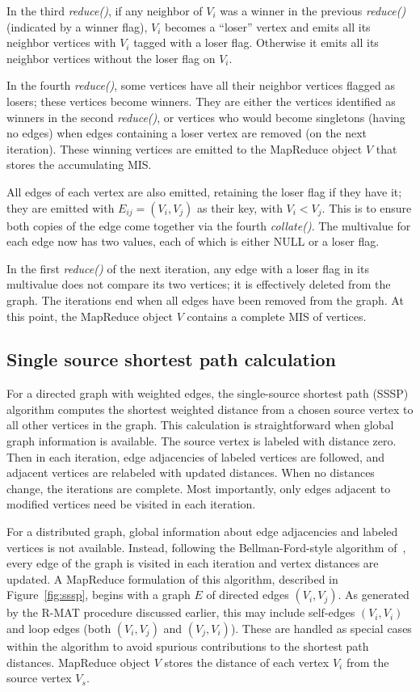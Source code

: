 In the third {\it reduce()}, if any neighbor of $V_i$ was a winner in
the previous {\it reduce()} (indicated by a winner flag), $V_i$
becomes a ``loser'' vertex and emits all its neighbor vertices with
$V_i$ tagged with a loser flag.  Otherwise it emits all its neighbor
vertices without the loser flag on $V_i$.

In the fourth {\it reduce()}, some vertices have all their neighbor
vertices flagged as losers; these vertices become winners.  They are
either the vertices identified as winners in the second {\it
reduce()}, or vertices who would become singletons (having no edges)
when edges containing a loser vertex are removed (on the next
iteration).  These winning vertices are emitted to the MapReduce
object $V$ that stores the accumulating MIS.

All edges of each vertex are also emitted, retaining the loser flag if
they have it; they are emitted with $E_{ij} = (V_i, V_j)$ as their
key, with $V_i < V_j$.  This is to ensure both copies of the edge come
together via the fourth {\it collate()}.  The multivalue for each edge
now has two values, each of which is either NULL or a loser flag.

In the first {\it reduce()} of the next iteration, any edge with a
loser flag in its multivalue does not compare its two vertices; it is
effectively deleted from the graph.  The iterations end when all edges
have been removed from the graph.  At this point, the MapReduce object
$V$ contains a complete MIS of vertices.

\subsection{Single source shortest path calculation}

For a directed graph with weighted edges, the single-source shortest
path (SSSP) algorithm computes the shortest weighted distance from a
chosen source vertex to all other vertices in the graph.  This
calculation is straightforward when global graph information is
available.  The source vertex is labeled with distance zero.  Then in
each iteration, edge adjacencies of labeled vertices are followed, and
adjacent vertices are relabeled with updated distances.  When no
distances change, the iterations are complete.  Most importantly, only
edges adjacent to modified vertices need be visited in each iteration.

For a distributed graph, global information about edge adjacencies and
labeled vertices is not available.  Instead, following the
Bellman-Ford-style algorithm of~\cite{SSSPMapReduce, Bellman58,
Ford62}, every edge of the graph is visited in each iteration and
vertex distances are updated.  A MapReduce formulation of this
algorithm, described in Figure~\ref{fig:sssp}, begins with a graph $E$
of directed edges $(V_i,V_j)$.  As generated by the R-MAT procedure
discussed earlier, this may include self-edges $(V_i,V_i)$ and loop
edges (both $(V_i,V_j)$ and $(V_j,V_i)$).  These are handled as
special cases within the algorithm to avoid spurious contributions to
the shortest path distances.  MapReduce object $V$ stores the distance
of each vertex $V_i$ from the source vertex $V_s$.

